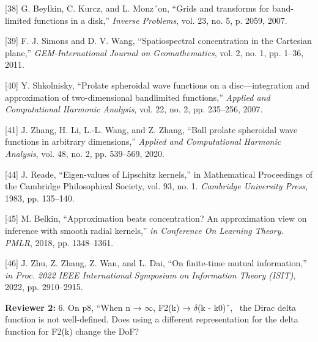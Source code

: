 \documentclass[a4paper,12pt]{article}
\begin{document}
{	[38] G. Beylkin, C. Kurcz, and L. Monz´on, “Grids and transforms for band-limited functions in a disk,” {\it Inverse Problems}, vol. 23,
	no. 5, p. 2059, 2007.
	
	[39] F. J. Simons and D. V. Wang, “Spatiospectral concentration in the Cartesian plane,” {\it GEM-International Journal on Geomathematics},
	vol. 2, no. 1, pp. 1–36, 2011.
	
	[40] Y. Shkolnisky, “Prolate spheroidal wave functions on a disc—integration and approximation of two-dimensional bandlimited
	functions,” {\it Applied and Computational Harmonic Analysis}, vol. 22, no. 2, pp. 235–256, 2007.
	
	[41] J. Zhang, H. Li, L.-L. Wang, and Z. Zhang, “Ball prolate spheroidal wave functions in arbitrary dimensions,” {\it Applied and
	Computational Harmonic Analysis}, vol. 48, no. 2, pp. 539–569, 2020.
	
	[44] J. Reade, “Eigen-values of Lipschitz kernels,” in Mathematical Proceedings of the Cambridge Philosophical Society, vol. 93, no. 1.
	{\it Cambridge University Press}, 1983, pp. 135–140.
	
	
	[45] M. Belkin, “Approximation beats concentration? An approximation view on inference with smooth radial kernels,” {\it in Conference
	On Learning Theory. PMLR}, 2018, pp. 1348–1361.
	
	[46] J. Zhu, Z. Zhang, Z. Wan, and L. Dai, “On finite-time mutual information,” {\it in Proc. 2022 IEEE International Symposium on
	Information Theory (ISIT)}, 2022, pp. 2910–2915.
}

\textbf{Reviewer 2:}
6. On p8, “When n → $\infty$, F2(k) → $\delta$(k - k0)”,  the Dirac delta function is not well-defined. Does using a different representation for the delta function for F2(k) change the DoF?


{}
\end{document}

